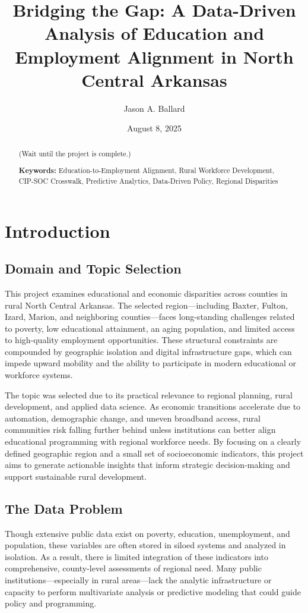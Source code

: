 \documentclass[12pt]{llncs}
\title{Bridging the Gap: A Data-Driven Analysis of Education and Employment Alignment in North Central Arkansas}
\author{Jason A. Ballard} \date{August 8, 2025}
\institute{Northwest Missouri State University, Maryville MO 64468, USA \\
\email{s574020@nwmissouri.edu}}
\begin{document}
\maketitle

\begin{abstract}
(Wait until the project is complete.)

\noindent\textbf{Keywords:} Education-to-Employment Alignment, Rural Workforce Development, CIP-SOC Crosswalk, Predictive Analytics, Data-Driven Policy, Regional Disparities
\end{abstract}

\section{Introduction}

\subsection{Domain and Topic Selection}
This project examines educational and economic disparities across counties in rural North Central Arkansas. The selected region—including Baxter, Fulton, Izard, Marion, and neighboring counties—faces long-standing challenges related to poverty, low educational attainment, an aging population, and limited access to high-quality employment opportunities. These structural constraints are compounded by geographic isolation and digital infrastructure gaps, which can impede upward mobility and the ability to participate in modern educational or workforce systems.\par
The topic was selected due to its practical relevance to regional planning, rural development, and applied data science. As economic transitions accelerate due to automation, demographic change, and uneven broadband access, rural communities risk falling further behind unless institutions can better align educational programming with regional workforce needs. By focusing on a clearly defined geographic region and a small set of socioeconomic indicators, this project aims to generate actionable insights that inform strategic decision-making and support sustainable rural development.

\subsection{The Data Problem}
Though extensive public data exist on poverty, education, unemployment, and population, these variables are often stored in siloed systems and analyzed in isolation. As a result, there is limited integration of these indicators into comprehensive, county-level assessments of regional need. Many public institutions—especially in rural areas—lack the analytic infrastructure or capacity to perform multivariate analysis or predictive modeling that could guide policy and programming.
\end{document}
